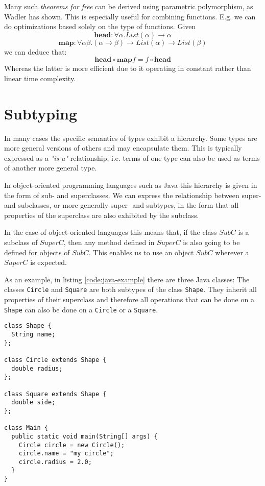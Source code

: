 Many such \emph{theorems for free} can be derived using parametric polymorphism, as Wadler has shown. \cite{wadlertheorems}
This is especially useful for combining functions.
E.g. we can do optimizations based solely on the type of functions.
Given
$$\mathbf{head}  : \forall \alpha. \mathit{List}(\alpha) \to \alpha$$
$$\mathbf{map} : \forall \alpha \beta. (\alpha \to \beta) \to \mathit{List}(\alpha) \to \mathit{List}(\beta)$$
we can deduce that: $$\mathbf{head} \circ \mathbf{map} f = f \circ \mathbf{head}$$
Whereas the latter is more efficient due to it operating in constant rather than linear time complexity.

\section{Subtyping}\label{sec:subtyping}

In many cases the specific semantics of types exhibit a hierarchy.
Some types are more general versions of others and may encapsulate them.
This is typically expressed as a \emph{"is-a"} relationship, i.e. terms of one type can also be used as terms of another more general type.

In object-oriented programming languages such as Java this hierarchy is given in the form of sub- and superclasses.
We can express the relationship between super- and subclasses, or more generally super- and subtypes,
in the form that all properties of the superclass are also exhibited by the subclass. \cite{subtyping}

In the case of object-oriented languages this means that, if the class $\mathit{SubC}$ is a subclass of $\mathit{SuperC}$,
then any method defined in $\mathit{SuperC}$ is also going to be defined for objects of $\mathit{SubC}$.
This enables us to use an object $\mathit{SubC}$ wherever a $\mathit{SuperC}$ is expected.

As an example, in listing \ref{code:java-example} there are three Java classes:
The classes \texttt{Circle} and \texttt{Square} are both subtypes of the class \texttt{Shape}.
They inherit all properties of their superclass and therefore all operations that can be done on a \texttt{Shape} can also be done on a \texttt{Circle} or a \texttt{Square}.

\begin{code}
\label{code:java-example}
\begin{verbatim}
class Shape {
  String name;
};

class Circle extends Shape {
  double radius;
};

class Square extends Shape {
  double side;
};

class Main {
  public static void main(String[] args) {
    Circle circle = new Circle();
    circle.name = "my circle";
    circle.radius = 2.0;
  }
}
\end{verbatim}
\end{code}

